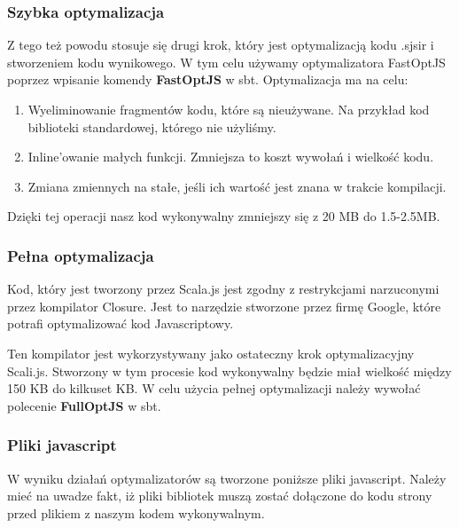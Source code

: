 
 


\subsubsection{Szybka optymalizacja}
Z tego też powodu stosuje się drugi krok, który jest optymalizacją kodu .sjsir i stworzeniem kodu wynikowego. W tym celu używamy optymalizatora FastOptJS poprzez wpisanie komendy \textbf{FastOptJS} w sbt. Optymalizacja ma na celu:
\begin{enumerate}
	\item Wyeliminowanie fragmentów kodu, które są nieużywane. Na przykład kod biblioteki standardowej, którego nie użyliśmy.
	\item Inline'owanie małych funkcji. Zmniejsza to koszt wywołań i wielkość kodu.
	\item Zmiana zmiennych na stałe, jeśli ich wartość jest znana w trakcie kompilacji.
\end{enumerate}

Dzięki tej operacji nasz kod wykonywalny zmniejszy się z 20 MB do 1.5-2.5MB\cite{ScalaCompilationProcess}.


\subsubsection{Pełna optymalizacja}

Kod, który jest tworzony przez Scala.js jest zgodny z restrykcjami narzuconymi przez kompilator Closure\cite{Closure}. Jest to narzędzie stworzone przez firmę Google, które potrafi optymalizować kod Javascriptowy.\cite{ClosureCompiler}

Ten kompilator jest wykorzystywany jako ostateczny krok optymalizacyjny Scali.js. Stworzony w tym procesie kod wykonywalny będzie miał wielkość między 150 KB do kilkuset KB.\cite{ScalaCompilationProcess}
W celu użycia pełnej optymalizacji należy wywołać polecenie \textbf{FullOptJS} w sbt.

\subsubsection{Pliki javascript}

W wyniku działań optymalizatorów są tworzone poniższe pliki javascript. Należy mieć na uwadze fakt, iż pliki bibliotek muszą zostać dołączone do kodu strony przed plikiem z naszym kodem wykonywalnym.

